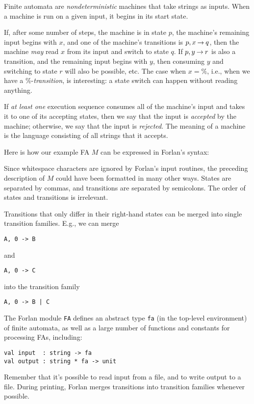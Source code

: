 Finite automata are \emph{nondeterministic} machines that take strings as
inputs.  When a machine is run on a given input, it begins in
its start state.

If, after some number of steps, the machine is in state $p$, the
machine's remaining input begins with $x$, and one of the machine's
transitions is $p,x\mathbin{\to} q$, then the machine \emph{may} read $x$ from
its input and switch to state $q$.  If $p, y\mathbin{\to} r$ is also a
transition, and the remaining input begins with $y$, then consuming
$y$ and switching to state $r$ will also be possible, etc.  The case
when $x=\%$, i.e., when we have a $\%$-\emph{transition}, is
interesting: a state switch can happen without reading anything.

If \emph{at least one} execution sequence consumes all of the machine's input
and takes it to one of its accepting states, then we say that the
input is \emph{accepted} by the machine; otherwise, we say that the
input is \emph{rejected}.  The meaning of a machine is the language
consisting of all strings that it accepts.

Here is how our example FA $M$ can be expressed in Forlan's syntax:

Since whitespace characters are ignored by Forlan's input routines,
the preceding description of $M$ could have been formatted in many other
ways.  States are separated by commas, and transitions are separated
by semicolons.  The order of states and transitions is irrelevant.

Transitions that only differ in their right-hand states can be
merged into single transition families.  E.g., we can merge
\begin{verbatim}
A, 0 -> B
\end{verbatim}
and
\begin{verbatim}
A, 0 -> C
\end{verbatim}
into the transition family
\begin{verbatim}
A, 0 -> B | C
\end{verbatim}

The Forlan module \texttt{FA} defines an abstract type \texttt{fa} (in
%
%
the top-level environment) of finite automata, as well as a large
number of functions and constants for processing FAs, including:
\begin{verbatim}
val input  : string -> fa
val output : string * fa -> unit 
\end{verbatim}
%
%
Remember that it's possible to read input from a file, and to write
output to a file.  During printing, Forlan merges transitions into
transition families whenever possible.

